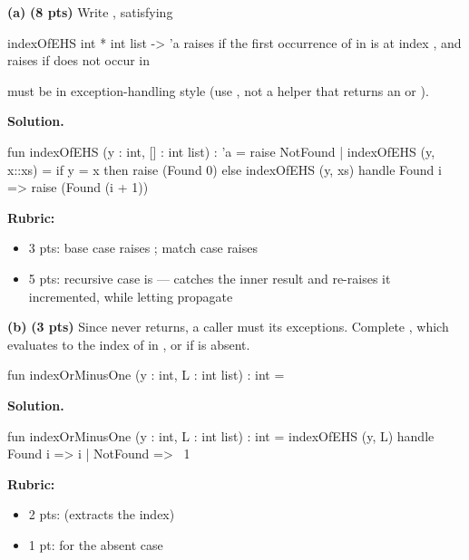 \documentclass[crop=false]{standalone}
\newif\ifsol
\newenvironment{solution}
    {\par\color{solution_color}\begin{framed}\textbf{Solution.}\par}
    {\end{framed}}
\newcommand{\subpts}[1]{\textbf{(#1 pts)}}
\newcommand{\answerspace}[1]{\ifsol\else\vspace{#1}\par\fi}
\begin{document}
\textbf{(a)} \subpts{8} Write , satisfying

\spec
  {indexOfEHS}
  {int * int list -> 'a}
  {}
  { raises  if the first occurrence of
    in  is at index , and raises  if
    does not occur in }

\begin{constraint}
   must be in exception-handling style (use ,
  not a helper that returns an  or ).
\end{constraint}

\answerspace{6cm}

\begin{solution}
\begin{codeblock}
  fun indexOfEHS (y : int, [] : int list) : 'a = raise NotFound
    | indexOfEHS (y, x::xs) =
        if y = x then raise (Found 0)
        else indexOfEHS (y, xs) handle Found i => raise (Found (i + 1))
\end{codeblock}

\textbf{Rubric:}
\begin{itemize}
  \item 3 pts: base case raises ; match case raises
  \item 5 pts: recursive case is  --- catches the inner result and re-raises it
    incremented, while letting  propagate
\end{itemize}
\end{solution}

\vspace{0.5em}

\textbf{(b)} \subpts{3} Since  never returns, a caller must
 its exceptions. Complete , which
evaluates to the index of  in , or  if  is
absent.

\begin{codeblock}
  fun indexOrMinusOne (y : int, L : int list) : int =
\end{codeblock}

\answerspace{3.5cm}

\begin{solution}
\begin{codeblock}
  fun indexOrMinusOne (y : int, L : int list) : int =
    indexOfEHS (y, L)
      handle Found i => i
           | NotFound => ~1
\end{codeblock}

\textbf{Rubric:}
\begin{itemize}
  \item 2 pts:  (extracts the index)
  \item 1 pt:  for the absent case
\end{itemize}
\end{solution}
\end{document}
